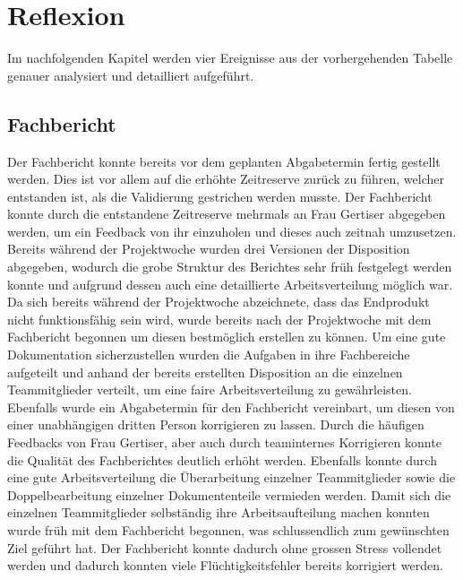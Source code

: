 \section{Reflexion}
Im nachfolgenden Kapitel werden vier Ereignisse aus der vorhergehenden Tabelle genauer analysiert und detailliert aufgeführt.

\subsection{Fachbericht}

Der Fachbericht konnte bereits vor dem geplanten Abgabetermin fertig gestellt werden. Dies ist vor allem auf die erhöhte Zeitreserve zurück zu führen, welcher entstanden ist, als die Validierung gestrichen werden musste.  Der Fachbericht konnte durch die entstandene Zeitreserve mehrmals an Frau Gertiser abgegeben werden, um ein Feedback von ihr einzuholen und dieses auch zeitnah umzusetzen. \newline
Bereits während der Projektwoche wurden drei Versionen der Disposition abgegeben, wodurch die grobe Struktur des Berichtes sehr früh festgelegt werden konnte und aufgrund dessen auch eine detaillierte Arbeitsverteilung möglich war. \newline
Da sich bereits während der Projektwoche abzeichnete, dass das Endprodukt nicht funktionsfähig sein wird, wurde bereits nach der Projektwoche mit dem Fachbericht begonnen um diesen bestmöglich erstellen zu können. \newline
Um eine gute Dokumentation sicherzustellen wurden die Aufgaben in ihre Fachbereiche aufgeteilt und anhand der bereits erstellten Disposition an die einzelnen Teammitglieder verteilt, um eine faire Arbeitsverteilung zu gewährleisten. Ebenfalls wurde ein Abgabetermin für den Fachbericht vereinbart, um diesen von einer unabhängigen dritten Person korrigieren zu lassen.\newline
Durch die häufigen Feedbacks von Frau Gertiser, aber auch durch teaminternes Korrigieren konnte die Qualität des Fachberichtes deutlich erhöht werden. Ebenfalls konnte durch eine gute Arbeitsverteilung die Überarbeitung einzelner Teammitglieder sowie die Doppelbearbeitung einzelner Dokumententeile vermieden werden. \newline
Damit sich die einzelnen Teammitglieder selbständig ihre Arbeitsaufteilung machen konnten wurde früh mit dem Fachbericht begonnen, was schlussendlich zum gewünschten Ziel geführt hat. Der Fachbericht konnte dadurch ohne grossen Stress vollendet werden und dadurch konnten viele Flüchtigkeitsfehler bereits korrigiert werden.
\newpage

